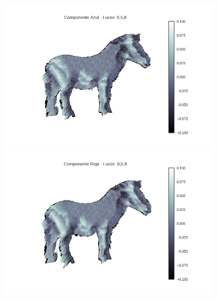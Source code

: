 \begin{figure}[H]
\centering
\begin{minipage}{.5\textwidth}
  \centering
  \includegraphics[width=1\linewidth]{informe/imagenes/profundidades/caballo058Azul.png}
\end{minipage}%
\begin{minipage}{.5\textwidth}
  \centering
    \includegraphics[width=1\linewidth]{informe/imagenes/profundidades/caballo058Rojo.png}
\end{minipage}
\end{figure}



